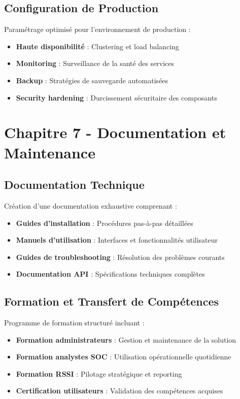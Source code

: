 \subsection{Configuration de Production}

Paramétrage optimisé pour l'environnement de production :
\begin{itemize}
    \item \textbf{Haute disponibilité} : Clustering et load balancing
    \item \textbf{Monitoring} : Surveillance de la santé des services
    \item \textbf{Backup} : Stratégies de sauvegarde automatisées
    \item \textbf{Security hardening} : Durcissement sécuritaire des composants
\end{itemize}

\section{Chapitre 7 - Documentation et Maintenance}

\subsection{Documentation Technique}

Création d'une documentation exhaustive comprenant :
\begin{itemize}
    \item \textbf{Guides d'installation} : Procédures pas-à-pas détaillées
    \item \textbf{Manuels d'utilisation} : Interfaces et fonctionnalités utilisateur
    \item \textbf{Guides de troubleshooting} : Résolution des problèmes courants
    \item \textbf{Documentation API} : Spécifications techniques complètes
\end{itemize}

\subsection{Formation et Transfert de Compétences}

Programme de formation structuré incluant :
\begin{itemize}
    \item \textbf{Formation administrateurs} : Gestion et maintenance de la solution
    \item \textbf{Formation analystes SOC} : Utilisation opérationnelle quotidienne
    \item \textbf{Formation RSSI} : Pilotage stratégique et reporting
    \item \textbf{Certification utilisateurs} : Validation des compétences acquises
\end{itemize}

